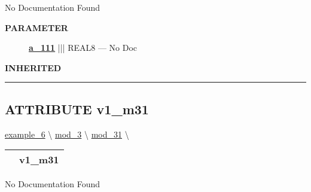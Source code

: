 \par





No Documentation Found






\par
\begin{description}
\item [\colorbox{tagtype}{\color{white} \textbf{\textsf{PARAMETER}}}] \textbf{\underline{a\_111}} ||| REAL8 --- No Doc
\end{description}








\par
\begin{description}
\item [\colorbox{tagtype}{\color{white} \textbf{\textsf{INHERITED}}}] 
\end{description}



\rule{\linewidth}{0.5pt}
\subsection*{\textsf{\colorbox{headtoc}{\color{white} ATTRIBUTE}
v1\_m31}}

\hypertarget{ecldoc:intest.inintest.example_6.mod_3.mod_31.v1_m31}{}
\hspace{0pt} \hyperlink{ecldoc:intest.inintest.example_6}{example_6} \textbackslash 
\hspace{0pt} \hyperlink{ecldoc:intest.inintest.example_6.mod_3}{mod_3} \textbackslash 
\hspace{0pt} \hyperlink{ecldoc:intest.inintest.example_6.mod_3.mod_31}{mod_31} \textbackslash 

{\renewcommand{\arraystretch}{1.5}
\begin{tabularx}{\textwidth}{|>{\raggedright\arraybackslash}l|X|}
\hline
\hspace{0pt}\mytexttt{\color{red} } & \textbf{v1\_m31} \\
\hline
\end{tabularx}
}

\par





No Documentation Found








